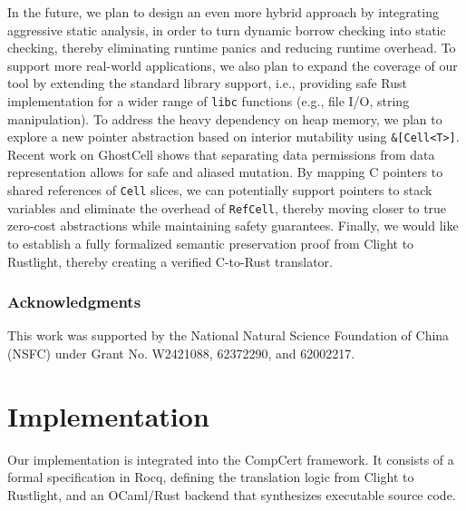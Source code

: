 \documentclass{llncs} %
\begin{document}
In the future, we plan to design an even more hybrid approach by integrating aggressive static analysis, in order to turn dynamic borrow checking into static checking, thereby eliminating runtime panics and reducing runtime overhead. To support more real-world applications, we also plan to expand the coverage of our tool by extending the standard library support, i.e., providing safe Rust implementation for a wider range of \texttt{libc} functions (e.g., file I/O, string manipulation). To address the heavy dependency on heap memory, we plan to explore a new pointer abstraction based on interior mutability using \texttt{\&[Cell<T>]}. Recent work on GhostCell \cite{Yanovski2021} shows that separating data permissions from data representation allows for safe and aliased mutation. By mapping C pointers to shared references of \texttt{Cell} slices, we can potentially support pointers to stack variables and eliminate the overhead of \texttt{RefCell}, thereby moving closer to true zero-cost abstractions while maintaining safety guarantees.
%
Finally, we would like to establish a fully formalized semantic preservation proof from Clight to Rustlight, thereby creating a verified C-to-Rust translator.


\subsubsection{Acknowledgments}
This work was supported by the National Natural Science Foundation of
  China (NSFC) under Grant No. W2421088, 62372290, and 62002217.


\newpage %
\appendix

\section{Implementation}
\label{sec:impl}

Our implementation is integrated into the CompCert framework. It consists of a formal specification in Rocq, defining the translation logic from Clight to Rustlight, and an OCaml/Rust backend that synthesizes executable source code. 
\end{document}
